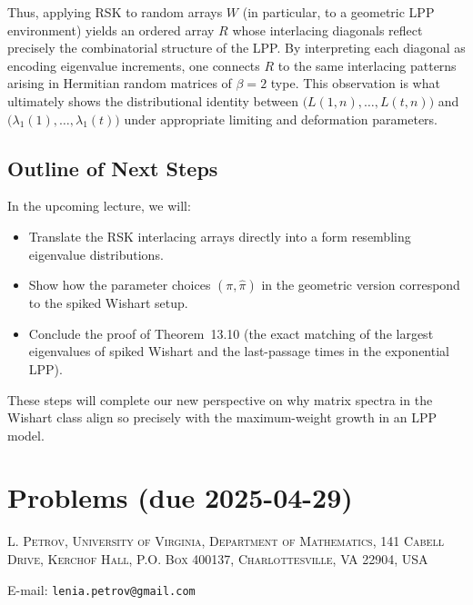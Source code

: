 \documentclass[letterpaper,11pt,oneside,reqno]{article}
\numberwithin{equation}{section}
\theoremstyle{definition}
\begin{document}
Thus, applying RSK to random arrays $W$ (in particular, to a geometric LPP environment) yields an ordered array $R$ whose interlacing diagonals reflect precisely the combinatorial structure of the LPP.  By interpreting each diagonal as encoding eigenvalue increments, one connects $R$ to the same interlacing patterns arising in Hermitian random matrices of $\beta=2$ type.  This observation is what ultimately shows the distributional identity between $\bigl(L(1,n),\dots,L(t,n)\bigr)$ and $\bigl(\lambda_1(1),\dots,\lambda_1(t)\bigr)$ under appropriate limiting and deformation parameters.

\subsection*{Outline of Next Steps}

In the upcoming lecture, we will:
\begin{itemize}
\item Translate the RSK interlacing arrays directly into a form resembling eigenvalue distributions.
\item Show how the parameter choices \((\pi,\hat\pi)\) in the geometric version correspond to the spiked Wishart setup.
\item Conclude the proof of Theorem~13.10 (the exact matching of the largest eigenvalues of spiked Wishart and the last-passage times in the exponential LPP).
\end{itemize}
These steps will complete our new perspective on why matrix spectra in the Wishart class align so precisely with the maximum-weight growth in an LPP model.


































\appendix
\setcounter{section}{13}

\section{Problems (due 2025-04-29)}









\medskip

\textsc{L. Petrov, University of Virginia, Department of Mathematics, 141 Cabell Drive, Kerchof Hall, P.O. Box 400137, Charlottesville, VA 22904, USA}

E-mail: \texttt{lenia.petrov@gmail.com}
\end{document}

